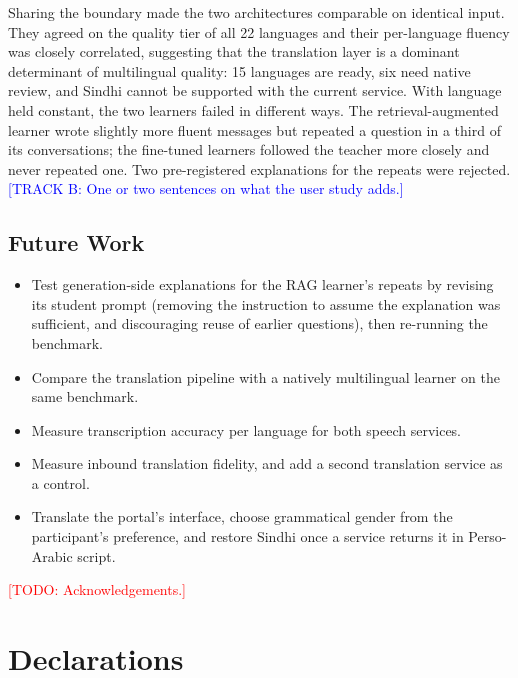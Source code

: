 \documentclass[pdflatex,sn-mathphys-num]{sn-jnl}%
\newcommand{\todo}[1]{\textcolor{red}{[TODO: #1]}}
\newcommand{\trackb}[1]{\textcolor{blue}{[TRACK B: #1]}}
\theoremstyle{thmstyleone}%
\theoremstyle{thmstyletwo}%
\theoremstyle{thmstylethree}%
\begin{document}
Sharing the boundary made the two architectures comparable on identical input. They agreed on the
quality tier of all 22 languages and their per-language fluency was closely correlated, suggesting
that the translation layer is a dominant determinant of multilingual quality: 15 languages are ready,
six need native review, and Sindhi cannot be supported with the current service. With language held
constant, the two learners failed in different ways. The retrieval-augmented learner wrote slightly
more fluent messages but repeated a question in a third of its conversations; the fine-tuned learners
followed the teacher more closely and never repeated one. Two pre-registered explanations for the
repeats were rejected. \trackb{One or two sentences on what the user study adds.}

\subsection{Future Work}

\begin{itemize}
\item Test generation-side explanations for the RAG learner's repeats by revising its student prompt
(removing the instruction to assume the explanation was sufficient, and discouraging reuse of earlier
questions), then re-running the benchmark.
\item Compare the translation pipeline with a natively multilingual learner on the same benchmark.
\item Measure transcription accuracy per language for both speech services.
\item Measure inbound translation fidelity, and add a second translation service as a control.
\item Translate the portal's interface, choose grammatical gender from the participant's preference,
and restore Sindhi once a service returns it in Perso-Arabic script.
\end{itemize}

\backmatter

\todo{Acknowledgements.}

\section*{Declarations}
\end{document}

